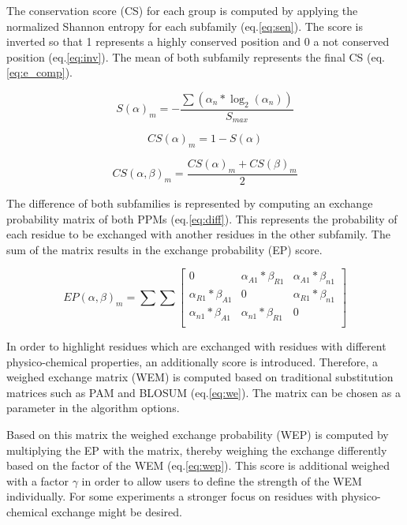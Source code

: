 \documentclass[a4paper,10pt]{article}
\begin{document}
The conservation score (CS) for each group is computed by applying the normalized Shannon entropy
for each subfamily (eq.\ref{eq:sen}). The score is inverted so that 1 represents a highly conserved position and 0
a not conserved position (eq.\ref{eq:inv}). The mean of both subfamily represents the final CS (eq.\ref{eq:e_comp}).

\begin{equation} \label{eq:sen}
S(\alpha)_m = -\frac{\sum(\alpha_n*\log_2(\alpha_n))}{S_{max}}
\end{equation}

\begin{equation} \label{eq:inv}
CS(\alpha)_m = 1 - S(\alpha) 
\end{equation}

\begin{equation} \label{eq:e_comp}
CS(\alpha, \beta)_m = \frac{CS(\alpha)_m + CS(\beta)_m}{2}
\end{equation}

The difference of both subfamilies is represented by computing an 
exchange probability matrix of both PPMs (eq.\ref{eq:diff}).
This represents the probability of each residue to be exchanged with another
residues in the other subfamily. The sum of the matrix results in the
exchange probability (EP) score.

\begin{equation}  \label{eq:diff}
EP(\alpha,\beta)_m =
  \sum \sum
  \begin{bmatrix}
    0 & \alpha_{A1} * \beta_{R1} & \alpha_{A1} * \beta_{n1} \\
    \alpha_{R1} * \beta_{A1} & 0 & \alpha_{R1} * \beta_{n1} \\
    \alpha_{n1} * \beta_{A1} & \alpha_{n1} * \beta_{R1} & 0 \\
  \end{bmatrix}
\end{equation}

In order to highlight residues which are exchanged with
residues with different physico-chemical properties, an additionally
score is introduced. Therefore, a weighed exchange matrix (WEM)
is computed based on traditional substitution matrices such as PAM and BLOSUM (eq.\ref{eq:we}). 
The matrix can be chosen as a parameter in the algorithm options.

Based on this matrix the weighed exchange probability (WEP) is computed by multiplying the
EP with the matrix, thereby weighing the exchange differently based on the factor of the WEM (eq.\ref{eq:wep}).
This score is additional weighed with a factor $\gamma$ in order to allow users to define the strength of the 
WEM individually. For some experiments a stronger focus on residues with physico-chemical exchange might be desired.
\end{document}

